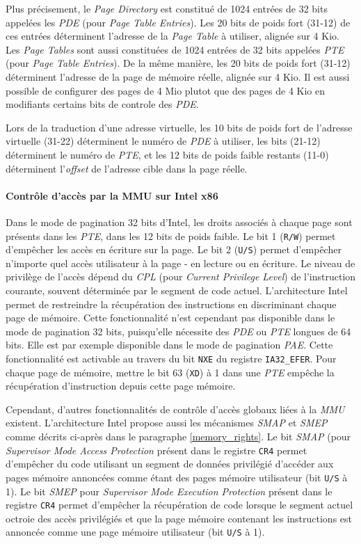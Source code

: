 Plus précisement, le \emph{Page Directory} est constitué de 1024 entrées de 32 bits appelées les \emph{PDE} (pour \emph{Page Table Entries}). Les 20 bits de poids fort (31-12) de ces entrées déterminent l'adresse de la \emph{Page Table} à utiliser, alignée sur 4 Kio. Les \emph{Page Tables} sont aussi constituées de 1024 entrées de 32 bits appelées \emph{PTE} (pour \emph{Page Table Entries}). De la même manière, les 20 bits de poids fort (31-12) déterminent l'adresse de la page de mémoire réelle, alignée sur 4 Kio. Il est aussi possible de configurer des pages de 4 Mio plutot que des pages de 4 Kio en modifiants certains bits de controle des \emph{PDE}.

Lors de la traduction d'une adresse virtuelle, les 10 bits de poids fort de l'adresse virtuelle (31-22) déterminent le numéro de \emph{PDE} à utiliser, les bits (21-12) déterminent le numéro de \emph{PTE}, et les 12 bits de poids faible restants (11-0) déterminent l'\emph{offset} de l'adresse cible dans la page réelle.~\cite{intel_32bits_paging}

\paragraph{Contrôle d'accès par la MMU sur Intel x86}
Dans le mode de pagination 32 bits d'Intel, les droits associés à chaque page sont présents dans les \emph{PTE}, dans les 12 bits de poids faible. Le bit 1 (\texttt{R/W}) permet d'empêcher les accès en écriture sur la page. Le bit 2 (\texttt{U/S}) permet d'empêcher n'importe quel accès utilisateur à la page - en lecture ou en écriture. Le niveau de privilège de l'accès dépend du \emph{CPL} (pour \emph{Current Privilege Level}) de l'instruction courante, souvent déterminée par le segment de code actuel.
L'architecture Intel permet de restreindre la récupération des instructions en discriminant chaque page de mémoire. Cette fonctionnalité n'est cependant pas disponible dans le mode de pagination 32 bits, puisqu'elle nécessite des \emph{PDE} ou \emph{PTE} longues de 64 bits. Elle est par exemple disponible dans le mode de pagination \emph{PAE}. Cette fonctionnalité est activable au travers du bit \texttt{NXE} du registre \texttt{IA32\_EFER}. Pour chaque page de mémoire, mettre le bit 63 (\texttt{XD}) à 1 dans une \emph{PTE} empêche la récupération d'instruction depuis cette page mémoire.

Cependant, d'autres fonctionnalités de contrôle d'accès globaux liées à la \emph{MMU} existent. L'architecture Intel propose aussi les mécanismes \emph{SMAP} et \emph{SMEP} comme décrits ci-après dans le paragraphe \ref{memory_rights}.
Le bit \emph{SMAP} (pour \emph{Supervisor Mode Access Protection} présent dans le registre \texttt{CR4} permet d'empêcher du code utilisant un segment de données privilégié d'accéder aux pages mémoire annoncées comme étant des pages mémoire utilisateur (bit \texttt{U/S} à 1).
Le bit \emph{SMEP} pour \emph{Supervisor Mode Execution Protection} présent dans le registre \texttt{CR4} permet d'empêcher la récupération de code lorsque le segment actuel octroie des accès privilégiés et que la page mémoire contenant les instructions est annoncée comme une page mémoire utilisateur (bit \texttt{U/S} à 1).

